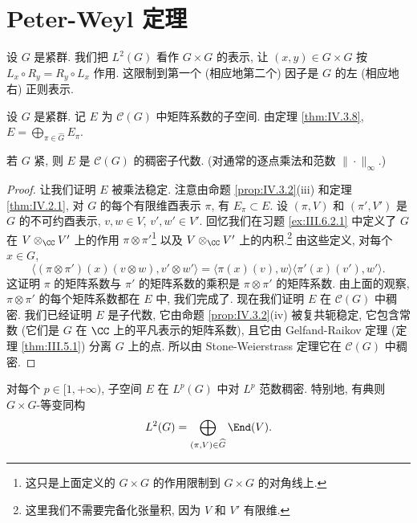 \section{Peter-Weyl 定理}
设 $G$ 是紧群. 我们把 $L^2(G)$ 看作 $G \times G$ 的表示, 让 $(x, y) \in G \times G$ 按 $L_x \circ R_y = R_y \circ L_x$ 作用. 这限制到第一个 (相应地第二个) 因子是 $G$ 的左 (相应地右) 正则表示.

\begin{definition}[矩阵系数的空间 $E$]
\label{def:IV.4.1}
设 $G$ 是紧群. 记 $E$ 为 $\mathcal{C}(G)$ 中矩阵系数的子空间.
由定理 \ref{thm:IV.3.8}, $E = \bigoplus_{\pi \in \widehat{G}}E_{\pi}$.
\end{definition}

\begin{theorem}
\label{thm:IV.4.2}
若 $G$ 紧, 则 $E$ 是 $\mathcal{C}(G)$ 的稠密子代数. (对通常的逐点乘法和范数 $\|\cdot\|_{\infty}$.)
\end{theorem}

\begin{proof}
让我们证明 $E$ 被乘法稳定. 注意由命题 \ref{prop:IV.3.2}(iii) 和定理 \ref{thm:IV.2.1}, 对 $G$ 的每个有限维酉表示 $\pi$, 有 $E_{\pi} \subset E$. 设 $(\pi, V)$ 和 $(\pi', V')$ 是 $G$ 的不可约酉表示, $v, w \in V$, $v', w' \in V'$. 回忆我们在习题 \ref{ex:III.6.2.1} 中定义了 $G$ 在 $V \otimes_{\CC}V'$ 上的作用 $\pi \otimes \pi'$\footnote{这只是上面定义的 $G \times G$ 的作用限制到 $G \times G$ 的对角线上.} 以及 $V \otimes_{\CC}V'$ 上的内积.\footnote{这里我们不需要完备化张量积, 因为 $V$ 和 $V'$ 有限维.} 由这些定义, 对每个 $x \in G$,
\[
\langle (\pi \otimes \pi')(x)(v \otimes w), v' \otimes w' \rangle = \langle \pi(x)(v), w \rangle\langle \pi'(x)(v'), w' \rangle.
\]
这证明 $\pi$ 的矩阵系数与 $\pi'$ 的矩阵系数的乘积是 $\pi \otimes \pi'$ 的矩阵系数. 由上面的观察, $\pi \otimes \pi'$ 的每个矩阵系数都在 $E$ 中, 我们完成了.
现在我们证明 $E$ 在 $\mathcal{C}(G)$ 中稠密. 我们已经证明 $E$ 是子代数, 它由命题 \ref{prop:IV.3.2}(iv) 被复共轭稳定, 它包含常数 (它们是 $G$ 在 $\CC$ 上的平凡表示的矩阵系数), 且它由 Gelfand-Raikov 定理 (定理 \ref{thm:III.5.1}) 分离 $G$ 上的点. 所以由 Stone-Weierstrass 定理它在 $\mathcal{C}(G)$ 中稠密.
\end{proof}

\begin{corollary}[$L^p$ 中的稠密性]
\label{cor:IV.4.3}
对每个 $p \in [1, +\infty)$, 子空间 $E$ 在 $L^p(G)$ 中对 $L^p$ 范数稠密.
特别地, 有典则 $G \times G$-等变同构
\[
L^2(G) = \bigoplus_{(\pi, V) \in \widehat{G}}\End(V).
\]
\end{corollary}

